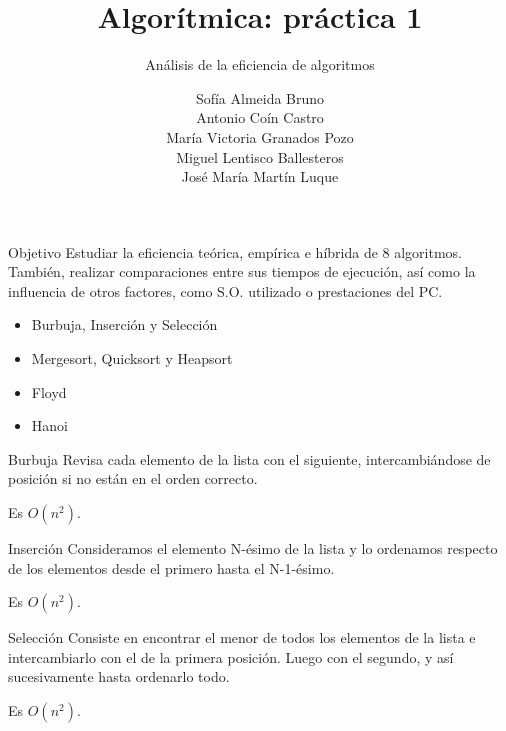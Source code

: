 \documentclass[spanish]{beamer}
\title{Algorítmica: práctica 1}
\subtitle{Análisis de la eficiencia de algoritmos}
\author{Sofía Almeida Bruno\\ Antonio Coín Castro\\ María Victoria Granados Pozo\\ Miguel Lentisco Ballesteros\\ José María Martín Luque}
\begin{document}
\maketitle

\begin{frame}{Objetivo}
	Estudiar la eficiencia teórica, empírica e híbrida de 8 algoritmos. También, realizar comparaciones entre sus tiempos de ejecución, así como la influencia de otros factores, como S.O. utilizado o prestaciones del PC.
	
	\begin{itemize}
		\item Burbuja, Inserción y Selección
		\item Mergesort, Quicksort y Heapsort
		\item Floyd
		\item Hanoi
	\end{itemize}
\end{frame}

\begin{frame}{Burbuja}
	Revisa cada elemento de la lista con el siguiente, intercambiándose de posición si no están en el orden correcto.
	
	\vskip 0.5cm
	
	Es $O(n^2)$.
	
\end{frame}

\begin{frame}{}
	\begin{center}
		
	\end{center}
\end{frame}

\begin{frame}{Inserción}
	Consideramos el elemento N-ésimo de la lista y lo ordenamos respecto de los elementos desde el primero hasta el N-1-ésimo.
	
	\vskip 0.5cm
	
	Es $O(n^2)$.
\end{frame}

\begin{frame}
	\begin{center}
		
	\end{center}
\end{frame}

\begin{frame}{Selección}
	Consiste en encontrar el menor de todos los elementos de la lista e intercambiarlo con el de la primera posición. Luego con el segundo, y así sucesivamente hasta ordenarlo todo.
	\vskip 0.5cm
	
	Es $O(n^2)$.
\end{frame}
\end{document}
